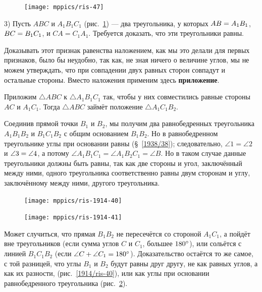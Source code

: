 \begin{figure}
\vskip-0mm
\centering
\texttt{[image: mppics/ris-47]}
\caption{}\label{1938/ris-47}
\end{figure}

3) Пусть $ABC$ и $A_1B_1C_1$ (рис.~\ref{1938/ris-47}) — два треугольника, у которых
$AB \z= A_1B_1$,
$BC \z= B_1C_1$,
и
$CA = C_1A_1$.
Требуется доказать, что эти треугольники равны.

Доказывать этот признак равенства наложением, как мы это делали для первых признаков, было бы неудобно, так как, не зная ничего о величине углов, мы не можем утверждать, что при совпадении двух равных сторон совпадут и остальные стороны.
Вместо наложения применим здесь \textbf{приложение}.

Приложим $\triangle ABC$ к $\triangle A_1B_1C_1$ так, чтобы у них совместились равные стороны $AC$ и $A_1C_1$.
Тогда $\triangle ABC$ займёт положение $\triangle A_1C_1B_2$.

Соединив прямой точки $B_1$ и $B_2$, мы получим два равнобедренных треугольника $A_1B_1B_2$ и $B_1C_1B_2$ с общим основанием $B_1B_2$.
Но в равнобедренном треугольнике углы при основании равны (§~\ref{1938/38});
следовательно, $\angle 1 = \angle 2$ и $\angle 3 \z= \angle 4$, а потому $\angle A_1B_1C_1 = \angle A_1B_2C_1 = \angle B$.
Но в таком случае данные треугольники должны быть равны, так как две стороны и угол, заключённый между ними, одного треугольника соответственно равны двум сторонам и углу, заключённому между ними, другого треугольника.

\begin{figure}
\vskip-4mm
\begin{minipage}{31mm}
\centering
\texttt{[image: mppics/ris-1914-40]}
\end{minipage}\hfill
\begin{minipage}{31mm}
\centering
\texttt{[image: mppics/ris-1914-41]}
\end{minipage}
\medskip
\begin{minipage}{31mm}
\centering
\caption{}\label{1914/ris-40}
\end{minipage}\hfill
\begin{minipage}{31mm}
\centering
\caption{}\label{1914/ris-41}
\end{minipage}

\end{figure}

\medskip

Может случиться, что прямая $B_1B_2$ не пересечётся со стороной $A_1C_1$,
а пойдёт вне треугольников (если сумма углов $C$ и $C_1$, большее $180\degree$),
или сольётся с линией $B_1C_1B_2$ (если $\angle C +\angle  C_1 \z= 180\degree$). Доказательство остаётся то же самое, с той разницей, что углы $B_1$ и $B_2$
будут равны друг другу, не как  равных углов, а как их разности, (рис.~\ref{1914/ris-40}), или как углы при основании равнобедренного треугольника (рис.~\ref{1914/ris-41}).


